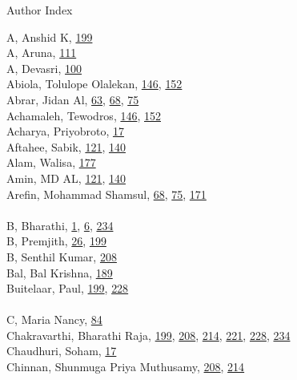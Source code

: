 \documentclass[11pt,oneside]{book}
\begin{document}
\begin{huge}
Author Index
\end{huge}
\vspace*{1em}
\begin{multicols}{2}
A, Anshid K, \hyperlink{page.199}{199}\\
A, Aruna, \hyperlink{page.111}{111}\\
A, Devasri, \hyperlink{page.100}{100}\\
Abiola, Tolulope Olalekan, \hyperlink{page.146}{146}, \hyperlink{page.152}{152}\\
Abrar, Jidan Al, \hyperlink{page.63}{63}, \hyperlink{page.68}{68}, \hyperlink{page.75}{75}\\
Achamaleh, Tewodros, \hyperlink{page.146}{146}, \hyperlink{page.152}{152}\\
Acharya, Priyobroto, \hyperlink{page.17}{17}\\
Aftahee, Sabik, \hyperlink{page.121}{121}, \hyperlink{page.140}{140}\\
Alam, Walisa, \hyperlink{page.177}{177}\\
Amin, MD AL, \hyperlink{page.121}{121}, \hyperlink{page.140}{140}\\
Arefin, Mohammad Shamsul, \hyperlink{page.68}{68}, \hyperlink{page.75}{75}, \hyperlink{page.171}{171}\\
\\ %
B, Bharathi, \hyperlink{page.1}{1}, \hyperlink{page.6}{6}, \hyperlink{page.234}{234}\\
B, Premjith, \hyperlink{page.26}{26}, \hyperlink{page.199}{199}\\
B, Senthil Kumar, \hyperlink{page.208}{208}\\
Bal, Bal Krishna, \hyperlink{page.189}{189}\\
Buitelaar, Paul, \hyperlink{page.199}{199}, \hyperlink{page.228}{228}\\
\\ %
C, Maria Nancy, \hyperlink{page.84}{84}\\
Chakravarthi, Bharathi Raja, \hyperlink{page.199}{199}, \hyperlink{page.208}{208}, \hyperlink{page.214}{214}, \hyperlink{page.221}{221}, \hyperlink{page.228}{228}, \hyperlink{page.234}{234}\\
Chaudhuri, Soham, \hyperlink{page.17}{17}\\
Chinnan, Shunmuga Priya Muthusamy, \hyperlink{page.208}{208}, \hyperlink{page.214}{214}\\

\end{multicols}
\end{document}

